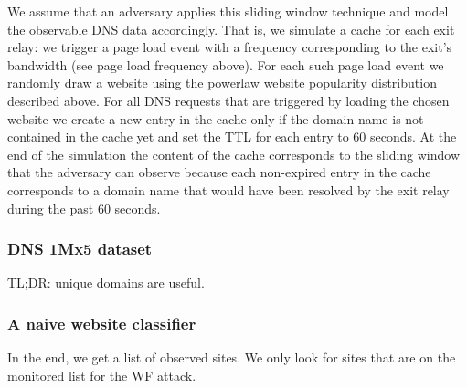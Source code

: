 We assume that an adversary applies this sliding window technique and
model the observable DNS data accordingly. That is, we simulate a cache for
each exit relay: we trigger a page load event with a frequency
corresponding to the exit's bandwidth (see page load frequency above).
For each such page load event we randomly draw a website using the
powerlaw website popularity distribution described above. For all DNS
requests that are triggered by loading the chosen website we create a
new entry in the cache only if the domain name is not contained in the
cache yet and set the TTL for each entry to 60 seconds. At the end of
the simulation the content of the cache corresponds to the sliding
window that the adversary can observe because each non-expired entry in
the cache corresponds to a domain name that would have been resolved by
the exit relay during the past 60 seconds.


\subsubsection{DNS 1Mx5 dataset}
TL;DR: unique domains are useful.

\subsubsection{A naive website classifier}
In the end, we get a list of observed sites. We only look for sites that are
on the monitored list for the WF attack.
